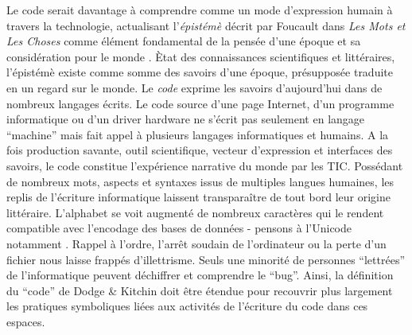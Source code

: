 Le code serait davantage à comprendre comme un mode d’expression humain à travers la technologie, actualisant l’\textit{épistémè} décrit par Foucault dans \textit{Les Mots et Les Choses} comme élément fondamental de la pensée d’une époque et sa considération pour le monde \citep{Foucault1996}. Ètat des connaissances scientifiques et littéraires, l'épistémè existe comme somme des savoirs d’une époque, présupposée traduite en un regard sur le monde. Le \textit{code} exprime les savoirs d’aujourd’hui dans de nombreux langages écrits. Le code source d’une page Internet, d’un programme informatique ou d’un driver hardware ne s’écrit pas seulement en langage ``machine'' mais fait appel à plusieurs langages informatiques et humains. A la fois production savante, outil scientifique, vecteur d’expression et interfaces des savoirs, le code constitue l’expérience narrative du monde par les TIC. Possédant de nombreux mots, aspects et syntaxes issus de multiples langues humaines, les replis de l’écriture informatique laissent transparaître de tout bord leur origine littéraire. L'alphabet se voit augmenté de nombreux caractères qui le rendent compatible avec l’encodage des bases de données - pensons à l’Unicode notamment \citep{Guichard2014}. Rappel à l'ordre, l'arrêt soudain de l’ordinateur ou la perte d’un fichier nous laisse frappés d’illettrisme. Seuls une minorité de personnes ``lettrées'' de l’informatique peuvent déchiffrer et comprendre le ``bug''. Ainsi, la définition du ``code'' de Dodge \&  Kitchin doit être étendue pour recouvrir plus largement les pratiques symboliques liées aux activités de l’écriture du code dans ces espaces.


